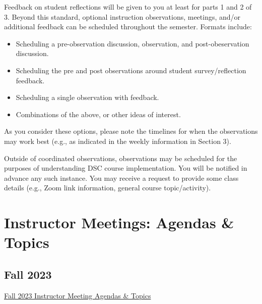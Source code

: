 \documentclass[
]{book}
\providecommand{\tightlist}{%
  \setlength{\itemsep}{0pt}\setlength{\parskip}{0pt}}
\begin{document}
Feedback on student reflections will be given to you at least for parts 1 and 2 of 3. Beyond this standard, optional instruction observations, meetings, and/or additional feedback can be scheduled throughout the semester. Formats include:

\begin{itemize}
\tightlist
\item
  Scheduling a pre-observation discussion, observation, and post-obeservation discussion.
\item
  Scheduling the pre and post observations around student survey/reflection feedback.
\item
  Scheduling a single observation with feedback.
\item
  Combinations of the above, or other ideas of interest.
\end{itemize}

As you consider these options, please note the timelines for when the observations may work best (e.g., as indicated in the weekly information in Section 3).

Outside of coordinated observations, observations may be scheduled for the purposes of understanding DSC course implementation. You will be notified in advance any such instance. You may receive a request to provide some class details (e.g., Zoom link information, general course topic/activity).

\hypertarget{instructor-meetings-agendas-topics}{%
\chapter{Instructor Meetings: Agendas \& Topics}\label{instructor-meetings-agendas-topics}}

\hypertarget{fall-2023}{%
\section{Fall 2023}\label{fall-2023}}

\href{https://docs.google.com/document/d/1Q_QcuQYQq2zpa6WMIYnB7TajFqMtxD8W2Eht7Zb3PRU/edit?usp=sharing}{Fall 2023 Instructor Meeting Agendas \& Topics}

  
\end{document}
